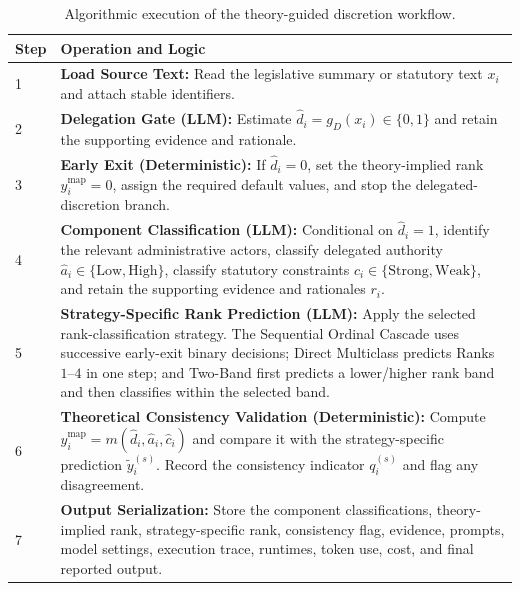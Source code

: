 \begin{table}[t]
\caption{Algorithmic execution of the theory-guided discretion workflow.}
\label{tab:algorithm}
\centering
\footnotesize
\begin{tabular}{p{}p{}}
\hline
\textbf{Step} & \textbf{Operation and Logic} \\
\hline

1 &
\textbf{Load Source Text:}
Read the legislative summary or statutory text \(x_i\) and attach
stable identifiers. \\

2 &
\textbf{Delegation Gate (LLM):}
Estimate
\(\hat d_i=g_D(x_i)\in\{0,1\}\)
and retain the supporting evidence and rationale. \\

3 &
\textbf{Early Exit (Deterministic):}
If \(\hat d_i=0\), set the theory-implied rank
\(y_i^{\mathrm{map}}=0\), assign the required default values, and stop
the delegated-discretion branch. \\

4 &
\textbf{Component Classification (LLM):}
Conditional on \(\hat d_i=1\), identify the relevant administrative
actors, classify delegated authority
\(\hat a_i\in\{\mathrm{Low},\mathrm{High}\}\), classify statutory
constraints
\(\hat c_i\in\{\mathrm{Strong},\mathrm{Weak}\}\), and retain the
supporting evidence and rationales \(r_i\). \\

5 &
\textbf{Strategy-Specific Rank Prediction (LLM):}
Apply the selected rank-classification strategy. The Sequential
Ordinal Cascade uses
successive early-exit binary decisions; Direct Multiclass predicts
Ranks \(1\)--\(4\) in one step; and Two-Band first predicts a
lower/higher rank band and then classifies within the selected band. \\

6 &
\textbf{Theoretical Consistency Validation (Deterministic):}
Compute
\(y_i^{\mathrm{map}}=m(\hat d_i,\hat a_i,\hat c_i)\)
and compare it with the strategy-specific prediction
\(\tilde y_i^{(s)}\). Record the consistency indicator
\(q_i^{(s)}\) and flag any disagreement. \\

7 &
\textbf{Output Serialization:}
Store the component classifications, theory-implied rank,
strategy-specific rank, consistency flag, evidence, prompts, model
settings, execution trace, runtimes, token use, cost, and final
reported output. \\

\hline
\end{tabular}
\end{table}


